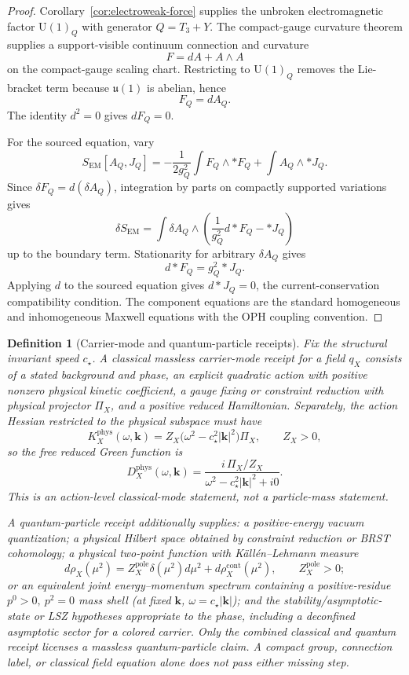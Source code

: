 \documentclass[11pt]{article}
\newtheorem{definition}[theorem]{Definition}
\newcommand{\U}{\mathrm{U}}
\begin{document}
\begin{proof}
Corollary~\ref{cor:electroweak-force} supplies the unbroken electromagnetic factor \(\U(1)_Q\) with generator \(Q=T_3+Y\). The compact-gauge curvature theorem supplies a support-visible continuum connection and curvature
\[
F=dA+A\wedge A
\]
on the compact-gauge scaling chart. Restricting to \(\U(1)_Q\) removes the Lie-bracket term because \(\mathfrak u(1)\) is abelian, hence
\[
F_Q=dA_Q.
\]
The identity \(d^2=0\) gives \(dF_Q=0\).

For the sourced equation, vary
\[
S_{\mathrm{EM}}[A_Q,J_Q]
=
-\frac{1}{2g_Q^2}\int F_Q\wedge *F_Q
+\int A_Q\wedge *J_Q.
\]
Since \(\delta F_Q=d(\delta A_Q)\), integration by parts on compactly supported variations gives
\[
\delta S_{\mathrm{EM}}
=
\int \delta A_Q\wedge
\left(
\frac{1}{g_Q^2}d*F_Q-*J_Q
\right)
\]
up to the boundary term. Stationarity for arbitrary \(\delta A_Q\) gives
\[
d*F_Q=g_Q^2 *J_Q.
\]
Applying \(d\) to the sourced equation gives \(d*J_Q=0\), the current-conservation compatibility condition. The component equations are the standard homogeneous and inhomogeneous Maxwell equations with the OPH coupling convention.
\end{proof}

\begin{definition}[Carrier-mode and quantum-particle receipts]
\label{def:carrier-particle-receipts}
Fix the structural invariant speed \(c_\star\). A classical massless carrier-mode receipt for a
field \(q_X\) consists of a stated background and phase, an explicit quadratic action
with positive nonzero physical kinetic coefficient, a gauge fixing or constraint reduction with physical projector
\(\Pi_X\), and a positive reduced Hamiltonian. Separately, the action Hessian restricted to the
physical subspace must have
\[
K_X^{\mathrm{phys}}(\omega,\mathbf k)
=Z_X\bigl(\omega^2-c_\star^2|\mathbf k|^2\bigr)\Pi_X,
\qquad Z_X>0,
\]
so the free reduced Green function is
\[
D_X^{\mathrm{phys}}(\omega,\mathbf k)
=\frac{i\,\Pi_X/Z_X}
{\omega^2-c_\star^2|\mathbf k|^2+i0}.
\]
This is an action-level classical-mode statement, not a particle-mass statement.

A quantum-particle receipt additionally supplies: a positive-energy vacuum quantization; a
physical Hilbert space obtained by constraint reduction or BRST cohomology; a physical two-point
function with K\"all\'en--Lehmann measure
\[
d\rho_X(\mu^2)
=Z_X^{\mathrm{pole}}\delta(\mu^2)d\mu^2+d\rho_X^{\mathrm{cont}}(\mu^2),
\qquad Z_X^{\mathrm{pole}}>0;
\]
or an equivalent joint energy--momentum spectrum containing a positive-residue
\(p^0>0,\ p^2=0\) mass shell (at fixed \(\mathbf k\),
\(\omega=c_\star|\mathbf k|\));
and the stability/asymptotic-state or LSZ hypotheses appropriate to the phase, including a
deconfined asymptotic sector for a colored carrier. Only the combined classical and quantum
receipt licenses a massless quantum-particle claim. A compact group, connection label, or
classical field equation alone does not pass either missing step.
\end{definition}
\end{document}
